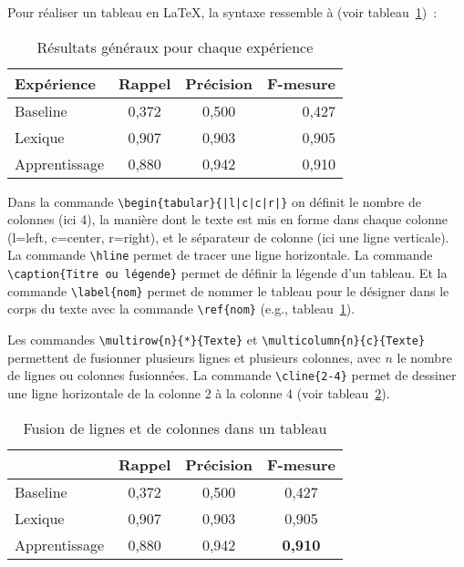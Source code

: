 Pour réaliser un  tableau en \LaTeX{}, la syntaxe
ressemble à (voir tableau~\ref{tab:exemple})~:
%
\begin{table}[h]
  \centering
  \begin{tabular}{|l|c|c|r|} \hline
    Expérience & Rappel & Précision & F-mesure \\ \hline
    Baseline & 0,372 & 0,500 & 0,427 \\
    Lexique & 0,907 & 0,903 & 0,905 \\
    Apprentissage & 0,880 & 0,942 & 0,910 \\ \hline
  \end{tabular}
  \caption{Résultats généraux pour chaque expérience}
  \label{tab:exemple}
\end{table}

Dans la commande \verb+\begin{tabular}{|l|c|c|r|}+ on définit le
  nombre de colonnes (ici 4), la manière dont le texte est mis en
  forme dans chaque colonne (l=left, c=center, r=right), et le
  séparateur de colonne (ici une ligne verticale). La commande
  \verb+\hline+ permet de tracer une ligne horizontale. La commande
  \verb+\caption{Titre ou légende}+ permet de définir la légende d'un
  tableau. Et la commande \verb+\label{nom}+ permet de nommer le
  tableau pour le désigner dans le corps du texte avec la commande
  \verb+\ref{nom}+ (e.g., tableau~\ref{tab:exemple}).

Les commandes \verb+\multirow{n}{*}{Texte}+ et
\verb+\multicolumn{n}{c}{Texte}+ permettent de fusionner plusieurs
lignes et plusieurs colonnes, avec $n$ le nombre de lignes ou colonnes
fusionnées. La commande \verb+\cline{2-4}+ permet de dessiner une
ligne horizontale de la colonne 2 à la colonne 4 (voir tableau~\ref{tab:autre}).
%
\begin{table}[h]
  \centering
  \begin{tabular}{|l|ccc|} \hline
    & Rappel & Précision & F-mesure \\ \hline
    Baseline & 0,372 & 0,500 & 0,427 \\
    Lexique & 0,907 & 0,903 & 0,905 \\
    Apprentissage & 0,880 & 0,942 & \textbf{0,910} \\ \hline
  \end{tabular}
  \caption{Fusion de lignes et de colonnes dans un tableau}
  \label{tab:autre}
\end{table}


